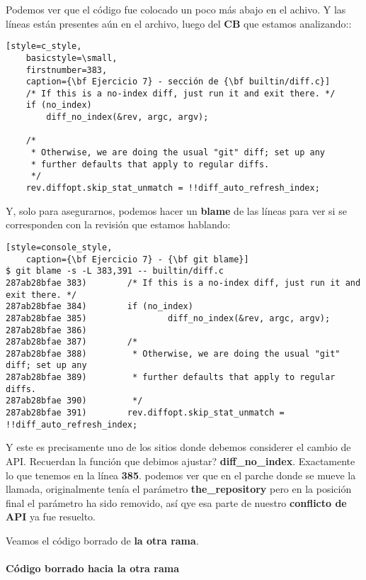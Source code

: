 Podemos ver que el código fue colocado un poco más abajo en el achivo. Y las líneas están presentes aún en el archivo, luego del {\bf CB} que estamos
analizando::

\begin{lstlisting}[style=c_style,
	basicstyle=\small,
	firstnumber=383,
	caption={\bf Ejercicio 7} - sección de {\bf builtin/diff.c}]
	/* If this is a no-index diff, just run it and exit there. */
	if (no_index)
		diff_no_index(&rev, argc, argv);

	/*
	 * Otherwise, we are doing the usual "git" diff; set up any
	 * further defaults that apply to regular diffs.
	 */
	rev.diffopt.skip_stat_unmatch = !!diff_auto_refresh_index;
\end{lstlisting}

Y, solo para asegurarnos, podemos hacer un {\bf blame} de las líneas para ver si se corresponden con la revisión que estamos hablando:

\begin{lstlisting}[style=console_style,
	caption={\bf Ejercicio 7} - {\bf git blame}]
$ git blame -s -L 383,391 -- builtin/diff.c
287ab28bfae 383)        /* If this is a no-index diff, just run it and exit there. */
287ab28bfae 384)        if (no_index)
287ab28bfae 385)                diff_no_index(&rev, argc, argv);
287ab28bfae 386) 
287ab28bfae 387)        /*
287ab28bfae 388)         * Otherwise, we are doing the usual "git" diff; set up any
287ab28bfae 389)         * further defaults that apply to regular diffs.
287ab28bfae 390)         */
287ab28bfae 391)        rev.diffopt.skip_stat_unmatch = !!diff_auto_refresh_index;
\end{lstlisting}

Y este es precisamente uno de los sitios donde debemos considerer el cambio de API. Recuerdan la función que debimos ajustar?
{\bf diff\_no\_index}. Exactamente lo que tenemos en la línea {\bf 385}. podemos ver que en el parche donde se mueve la llamada, originalmente
tenía el parámetro {\bf the\_repository} pero en la posición final el parámetro ha sido removido, así qye esa parte de nuestro {\bf conflicto
de API} ya fue resuelto.

Veamos el código borrado de {\bf la otra rama}.

\paragraph{Código borrado hacia la otra rama}


